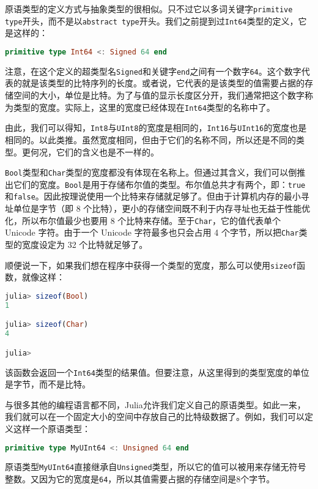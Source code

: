 原语类型的定义方式与抽象类型的很相似。只不过它以多词关键字\verb|primitive type|开头，而不是以\verb|abstract type|开头。我们之前提到过\verb|Int64|类型的定义，它是这样的：

\begin{lstlisting}[language=julia]
primitive type Int64 <: Signed 64 end
\end{lstlisting}

注意，在这个定义的超类型名\verb|Signed|和关键字\verb|end|之间有一个数字\verb|64|。这个数字代表的就是该类型的比特序列的长度。或者说，它代表的是该类型的值需要占据的存储空间的大小，单位是比特。为了与值的显示长度区分开，我们通常把这个数字称为类型的宽度。实际上，这里的宽度已经体现在\verb|Int64|类型的名称中了。

由此，我们可以得知，\verb|Int8|与\verb|UInt8|的宽度是相同的，\verb|Int16|与\verb|UInt16|的宽度也是相同的。以此类推。虽然宽度相同，但由于它们的名称不同，所以还是不同的类型。更何况，它们的含义也是不一样的。

\verb|Bool|类型和\verb|Char|类型的宽度都没有体现在名称上。但通过其含义，我们可以倒推出它们的宽度。\verb|Bool|是用于存储布尔值的类型。布尔值总共才有两个，即：\verb|true|和\verb|false|。因此按理说使用一个比特来存储就足够了。但由于计算机内存的最小寻址单位是字节（即 8 个比特），更小的存储空间既不利于内存寻址也无益于性能优化，所以布尔值最少也要用 8 个比特来存储。至于\verb|Char|，它的值代表单个 Unicode 字符。由于一个 Unicode 字符最多也只会占用 4 个字节，所以把\verb|Char|类型的宽度设定为 32 个比特就足够了。

顺便说一下，如果我们想在程序中获得一个类型的宽度，那么可以使用\verb|sizeof|函数，就像这样：

\begin{lstlisting}[language=julia]
julia> sizeof(Bool)
1

julia> sizeof(Char)
4

julia> 
\end{lstlisting}

该函数会返回一个\verb|Int64|类型的结果值。但要注意，从这里得到的类型宽度的单位是字节，而不是比特。

与很多其他的编程语言都不同，Julia允许我们定义自己的原语类型。如此一来，我们就可以在一个固定大小的空间中存放自己的比特级数据了。例如，我们可以定义这样一个原语类型：

\begin{lstlisting}[language=julia]
primitive type MyUInt64 <: Unsigned 64 end
\end{lstlisting}

原语类型\verb|MyUInt64|直接继承自\verb|Unsigned|类型，所以它的值可以被用来存储无符号整数。又因为它的宽度是\verb|64|，所以其值需要占据的存储空间是8个字节。

